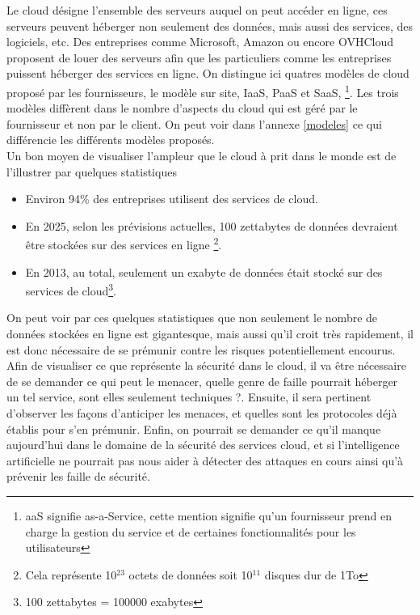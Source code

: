 \documentclass[a4paper, 12pt]{article}
\begin{document}
    Le cloud désigne l'ensemble des serveurs auquel on peut accéder en ligne,
    ces serveurs peuvent héberger non seulement des données, mais aussi des
    services, des logiciels, etc. Des entreprises comme Microsoft, Amazon ou
    encore OVHCloud proposent de louer des serveurs afin que les particuliers
    comme les entreprises puissent héberger des services en ligne. On distingue
    ici quatres modèles de cloud proposé par les fournisseurs, le modèle sur
    site, IaaS, PaaS et SaaS, \footnote{aaS signifie as-a-Service, cette mention
    signifie qu'un fournisseur prend en charge la gestion du service et de
    certaines fonctionnalités pour les utilisateurs}. Les trois modèles
    diffèrent dans le nombre d'aspects du cloud qui est géré par le fournisseur
    et non par le client. On peut voir dans l'annexe \ref{modeles} ce qui
    différencie les différents modèles proposés. \\

    Un bon moyen de visualiser l'ampleur que le cloud à prit dans le monde est
    de l'illustrer par quelques statistiques

    \begin{itemize}
      \item Environ 94\% des entreprises utilisent des services de cloud.
      \item En 2025, selon les prévisions actuelles, 100 zettabytes de données
            devraient être stockées sur des services en ligne
            \footnote{Cela représente 10$^{23}$ octets de données soit
            10$^{11}$ disques dur de 1To}.
      \item En 2013, au total, seulement un exabyte de données était stocké
            sur des services de cloud\footnote{100 zettabytes = 100000
            exabytes}.
    \end{itemize}

    On peut voir par ces quelques statistiques que non seulement le nombre de
    données stockées en ligne est gigantesque, mais aussi qu'il croit très
    rapidement, il est donc nécessaire de se prémunir contre les risques
    potentiellement encourus. \\

    Afin de visualiser ce que représente la sécurité dans le cloud, il va être
    nécessaire de se demander ce qui peut le menacer, quelle genre de faille
    pourrait héberger un tel service, sont elles seulement techniques ?.
    Ensuite, il sera pertinent d'observer les façons d'anticiper les menaces, et
    quelles sont les protocoles déjà établis pour s'en prémunir. Enfin, on
    pourrait se demander ce qu'il manque aujourd'hui dans le domaine de la
    sécurité des services cloud, et si l'intelligence artificielle ne pourrait
    pas nous aider à détecter des attaques en cours ainsi qu'à prévenir les
    faille de sécurité.
\end{document}
